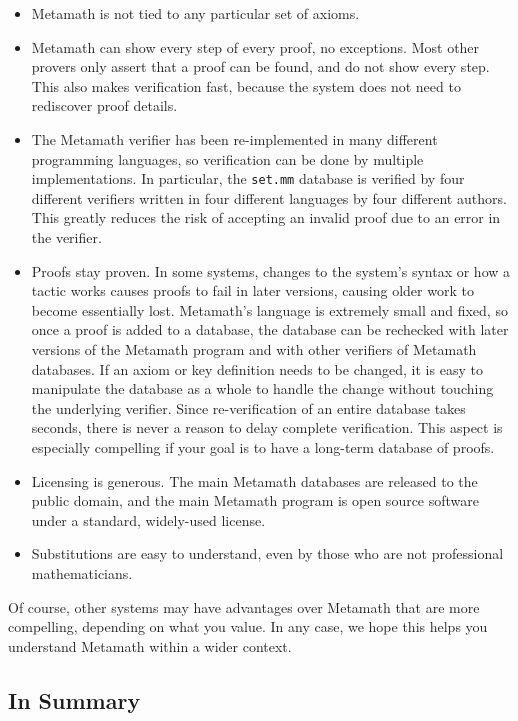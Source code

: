 \begin{itemize}
\item Metamath is not tied to any particular set of axioms.
\item Metamath can show every step of every proof, no exceptions.
  Most other provers only assert that a proof can be found, and do not
  show every step. This also makes verification fast, because
  the system does not need to rediscover proof details.
\item The Metamath verifier has been re-implemented in many different
  programming languages, so verification can be done by multiple
  implementations.  In particular, the
  \texttt{set.mm}%
   database is verified by
  four different verifiers
  written in four different languages by four different authors.
  This greatly reduces the risk of accepting an invalid
  proof due to an error in the verifier.
\item Proofs stay proven.  In some systems, changes to the system's
  syntax or how a tactic works causes proofs to fail in later versions,
  causing older work to become essentially lost.
  Metamath's language is
  extremely small and fixed, so once a proof is added to a database,
  the database can be rechecked with later versions of the Metamath program
  and with other verifiers of Metamath databases.
  If an axiom or key definition needs to be changed, it is easy to
  manipulate the database as a whole to handle the change
  without touching the underlying verifier.
  Since re-verification of an entire database takes seconds, there
  is never a reason to delay complete verification.
  This aspect is especially compelling if your
  goal is to have a long-term database of proofs.
\item Licensing is generous.  The main Metamath databases are released to
  the public domain, and the main Metamath program is open source software
  under a standard, widely-used license.
\item Substitutions are easy to understand, even by those who are not
  professional mathematicians.
\end{itemize}

Of course, other systems may have advantages over Metamath
that are more compelling, depending on what you value.
In any case, we hope this helps you understand Metamath
within a wider context.

\subsection{In Summary}\label{computers-summary}

